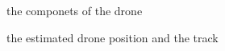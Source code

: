 \documentclass[lettersize,journal]{IEEEtran}
\begin{document}
\begin{figure}[htbp]
  \begin{center}
  \end{center}
  \caption{the componets of the drone}
  \label{fig:drone}
\end{figure}

\begin{figure}[htbp]
  \begin{center}
  \end{center}
  \caption{the estimated drone position and the track}
  \label{fig:drone_posi}
\end{figure}
\end{document}

